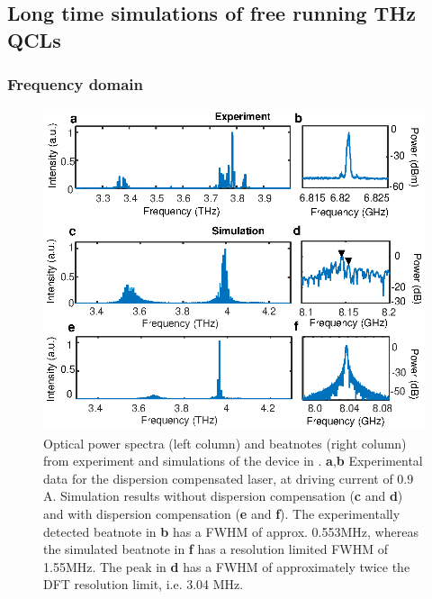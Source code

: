 \documentclass[twocolumn,secnumarabic,amssymb, nobibnotes, aps, prd]{revtex4-1}
\begin{document}
{			\subsection{Long time simulations of free running THz QCLs}
			\label{subsec:tdsims}
			
			\subsubsection{Frequency domain}
			
			\begin{figure}[h!]
				\begin{center}
					\includegraphics[scale=.85]{figs/SPECTRA_EXPERIMENT.eps}
					\caption{ Optical power spectra (left column) and beatnotes (right column) from experiment and simulations of the device in \cite{burghoff2014terahertz}. \textbf{a},\textbf{b} Experimental data for the dispersion compensated laser, at driving current of $0.9$ A. Simulation results without dispersion compensation (\textbf{c} and \textbf{d})  and with dispersion compensation (\textbf{e} and \textbf{f}). The experimentally detected beatnote in \textbf{b} has a FWHM of approx. 0.553MHz, whereas the simulated beatnote in \textbf{f} has a resolution limited FWHM of 1.55MHz. The peak in \textbf{d} has a FWHM of approximately twice the DFT resolution limit, i.e. 3.04 MHz.} \label{fig:img05}
				\end{center}	
			\end{figure}
			
}
\end{document}
